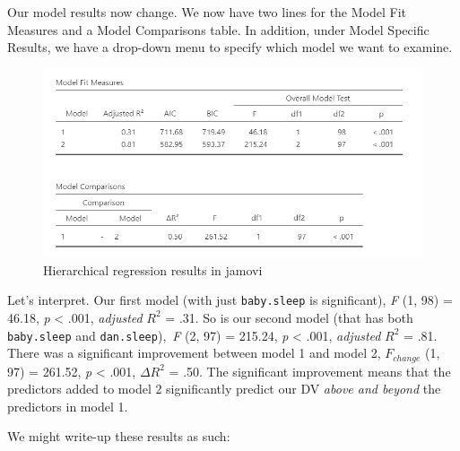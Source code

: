 \documentclass[
]{book}
\begin{document}
Our model results now change. We now have two lines for the Model Fit Measures and a Model Comparisons table. In addition, under Model Specific Results, we have a drop-down menu to specify which model we want to examine.

\begin{figure}

{\centering \includegraphics[width=1\linewidth]{images/13-regression/hierarchical-results} 

}

\caption{Hierarchical regression results in jamovi}\label{fig:unnamed-chunk-13}
\end{figure}

Let's interpret. Our first model (with just \texttt{baby.sleep} is significant), \emph{F} (1, 98) = 46.18, \emph{p} \textless{} .001, \emph{adjusted} \(R^2\) = .31. So is our second model (that has both \texttt{baby.sleep} and \texttt{dan.sleep}),~\emph{F} (2, 97) = 215.24, \emph{p} \textless{} .001, \emph{adjusted} \(R^2\) = .81. There was a significant improvement between model 1 and model 2, \(F_{change}\) (1, 97) = 261.52, \emph{p} \textless{} .001, \(\Delta R^2\) = .50. The significant improvement means that the predictors added to model 2 significantly predict our DV \emph{above and beyond} the predictors in model 1.

We might write-up these results as such:
\end{document}
